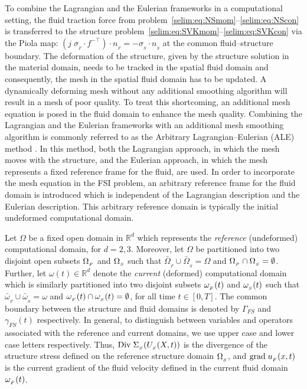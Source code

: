 To combine the Lagrangian and the Eulerian frameworks
in a computational setting, the fluid traction force from
problem~\eqref{selim:eq:NSmom}--\eqref{selim:eq:NScon} is transferred to
the structure problem~\eqref{selim:eq:SVKmom}--\eqref{selim:eq:SVKcon}
via the Piola map: $(j\;\sigma_{_{F}}\cdot f^{-\top})\cdot n_{_{F}} = -
\sigma_{_{S}}\cdot n_{_{S}}$ at the common fluid--structure boundary.
The deformation of the structure, given by the structure solution
in the material domain, needs to be tracked in the spatial fluid
domain and consequently, the mesh in the spatial fluid domain has
to be updated. A dynamically deforming mesh without any additional
smoothing algorithm will result in a mesh of poor quality. To treat
this shortcoming, an additional mesh equation is posed in the fluid
domain to enhance the mesh quality. Combining the Lagrangian and the
Eulerian frameworks with an additional mesh smoothing algorithm is
commonly referred to as the Arbitrary Lagrangian--Eulerian (ALE) method
\citep{DoneaGiulianiHalleux1982,DoneaHuertaPonthotEtAl2004}. In this
method, both the Lagrangian approach, in which the mesh moves with the
structure, and the Eulerian approach, in which the mesh represents a
fixed reference frame for the fluid, are used. In order to incorporate
the mesh equation in the FSI problem, an arbitrary reference frame for
the fluid domain is introduced which is independent of the Lagrangian
description and the Eulerian description. This arbitrary reference domain
is typically the initial undeformed computational domain.

Let $\Omega$ be a fixed open domain in $\mathbb{R}^d$ which represents
the \emph{reference} (undeformed) computational domain, for
$d=2,3$. Moreover, let $\Omega$ be partitioned into two disjoint open
subsets $\Omega_{_{F}}$ and $\Omega_{_{S}}$ such that
$\bar{\Omega}_{_{F}}\cup\bar{\Omega}_{_{S}} = \Omega$ and
$\Omega_{_{F}}\cap\Omega_{_{S}}=\emptyset$. Further, let $\omega(t)\in\mathbb{R}^d$ denote
the \emph{current} (deformed) computational domain which is similarly
partitioned into two disjoint subsets $\omega_{_{F}}(t)$ and $\omega_{_{S}}(t)$ such that
$\bar{\omega}_{_{F}}\cup\bar{\omega}_{_{S}} = \omega$ and
$\omega_{_{F}}(t)\cap\omega_{_{S}}(t)=\emptyset$, for all time $t\in[0,T]$. The common
boundary between the structure and fluid domains is denoted by
$\Gamma_{FS}$ and $\gamma_{FS}(t)$ respectively. In general, to
distinguish between variables and operators associated with the
reference and current domains, we use upper case and lower case
letters respectively. Thus, $\textrm{Div}\;\Sigma_{_{S}}(U_{_{S}}(X,t))$ is the divergence
of the structure stress defined on the reference structure domain
$\Omega_{_{S}}$, and $\textrm{grad}\;u_{_{F}}(x,t)$ is the current gradient of the fluid
velocity defined in the current fluid domain $\omega_{_{F}}(t)$.

